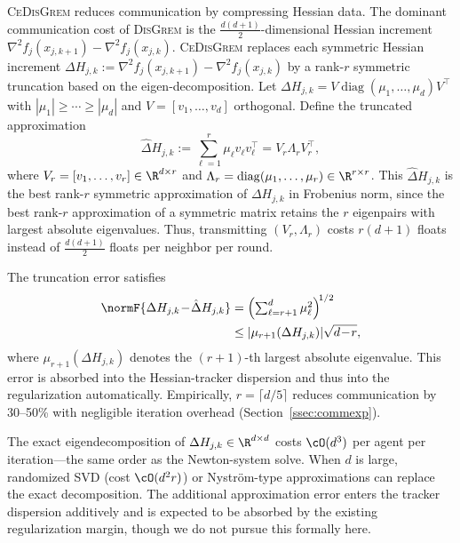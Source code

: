 \documentclass[review,onefignum,onetabnum]{siamart171218}
\begin{document}
\textsc{CeDisGrem} reduces communication by compressing Hessian data.
The dominant communication cost of \textsc{DisGrem} is the $\frac{d(d+1)}{2}$-dimensional
Hessian increment $\nabla^2 f_j(x_{j,k+1})-\nabla^2 f_j(x_{j,k})$.
\textsc{CeDisGrem} replaces each symmetric Hessian increment
$\Delta H_{j,k}:=\nabla^2 f_j(x_{j,k+1})-\nabla^2 f_j(x_{j,k})$
by a rank-$r$ symmetric truncation based on the eigen-decomposition.
Let $\Delta H_{j,k}=V\operatorname{diag}(\mu_1,\dots,\mu_d)V^\top$ with
$|\mu_1|\ge \cdots \ge |\mu_d|$ and $V=[v_1,\dots,v_d]$ orthogonal.
Define the truncated approximation
\[
\hat\Delta H_{j,k}:=\sum_{\ell=1}^r \mu_\ell v_\ell v_\ell^\top
= V_r\Lambda_r V_r^\top,
\]
where $V_r=[v_1,\dots,v_r]\in\R^{d\times r}$ and $\Lambda_r=\operatorname{diag}(\mu_1,\dots,\mu_r)\in\R^{r\times r}$.
This $\hat\Delta H_{j,k}$ is the best rank-$r$ symmetric approximation of $\Delta H_{j,k}$ in Frobenius norm,
since the best rank-$r$ approximation of a symmetric matrix retains the $r$ eigenpairs with largest absolute eigenvalues.
Thus, transmitting $(V_r,\Lambda_r)$ costs $r(d+1)$ floats instead of $\frac{d(d+1)}{2}$ floats per neighbor per round.

The truncation error satisfies
\begin{align*}
\normF{\Delta H_{j,k}\!-\!\hat\Delta H_{j,k}}
&=\Bigl(\textstyle\sum_{\ell=r+1}^d \mu_\ell^2\Bigr)^{\!1/2}\\
&\le |\mu_{r+1}(\Delta H_{j,k})|\sqrt{d\!-\!r},
\end{align*}
where $\mu_{r+1}(\Delta H_{j,k})$ denotes the $(r+1)$-th largest absolute eigenvalue.
This error is absorbed into the Hessian-tracker dispersion and thus into the regularization automatically.
Empirically, $r=\lceil d/5\rceil$ reduces communication by 30--50\% with negligible iteration overhead
(Section~\ref{ssec:commexp}).

\begin{remark}
The exact eigendecomposition of $\Delta H_{j,k}\in\R^{d\times d}$
costs $\cO(d^3)$ per agent per iteration---the same order as the
Newton-system solve.
When $d$ is large, randomized SVD
(cost $\cO(d^2 r)$) or Nystr\"om-type approximations can replace
the exact decomposition.
The additional approximation error enters the tracker dispersion
additively and is expected to be absorbed by the existing
regularization margin, though we do not pursue this formally here.
\end{remark}
	
\end{document}
